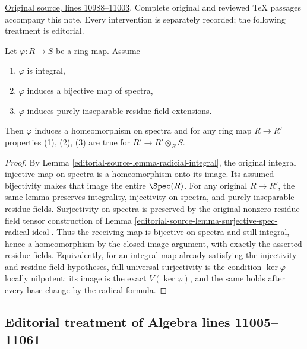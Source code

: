 \hypertarget{algebra-context-134}{}

\noindent\href{https://github.com/stacks/stacks-project/blob/a04446e57ec1fbc252a871afcec7752fb2807b14/algebra.tex\#L10988}{Original source, lines 10988--11003}. Complete original and reviewed TeX passages accompany this note. Every intervention is separately recorded; the following treatment is editorial.


\begin{lemma}
\label{editorial-source-lemma-radicial-integral-bijective}
Let $\varphi : R \to S$ be a ring map. Assume
\begin{enumerate}
\item $\varphi$ is integral,
\item $\varphi$ induces a bijective map of spectra,
\item $\varphi$ induces purely inseparable residue field extensions.
\end{enumerate}
Then $\varphi$ induces a homeomorphism on spectra and for any ring map
$R \to R'$ properties (1), (2), (3) are true for $R' \to R' \otimes_R S$.
\end{lemma}

\begin{proof}
By Lemma \ref{editorial-source-lemma-radicial-integral}, the
original integral injective map on spectra
is a homeomorphism onto its image.
Its assumed bijectivity makes that image
the entire $\Spec(R)$. For any original
$R\to R'$, the same lemma preserves
integrality, injectivity on spectra,
and purely inseparable residue fields.
Surjectivity on spectra is preserved
by the original nonzero residue-field
tensor construction of Lemma
\ref{editorial-source-lemma-surjective-spec-radical-ideal}.
Thus the receiving map is bijective
on spectra and still integral, hence
a homeomorphism by the closed-image
argument, with exactly the asserted
residue fields. Equivalently, for
an integral map already satisfying
the injectivity and residue-field
hypotheses, full universal surjectivity
is the condition $\ker\varphi$
locally nilpotent: its image is
the exact $V(\ker\varphi)$, and
the same holds after every base
change by the radical formula.
\end{proof}


\subsection{Editorial treatment of Algebra lines 11005--11061}

\hypertarget{algebra-context-135}{}

